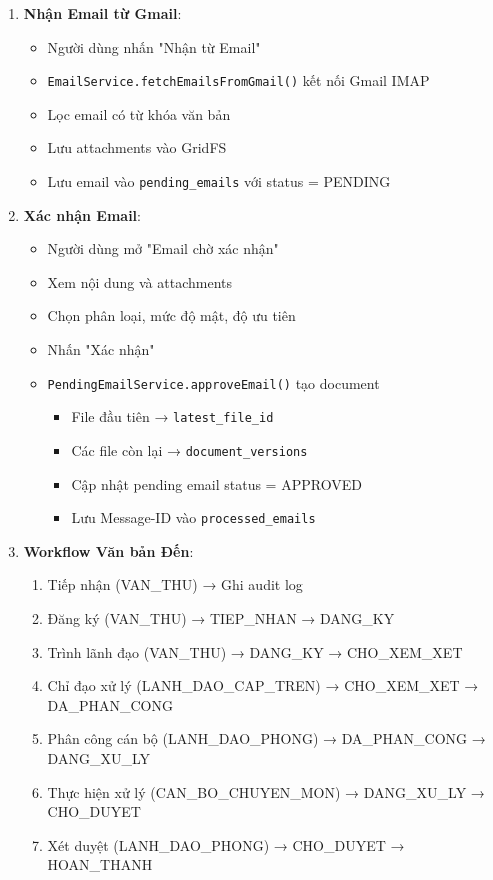 \documentclass[12pt,a4paper]{article}
\begin{document}
\begin{enumerate}
    \item \textbf{Nhận Email từ Gmail}:
    \begin{itemize}
        \item Người dùng nhấn "Nhận từ Email"
        \item \texttt{EmailService.fetchEmailsFromGmail()} kết nối Gmail IMAP
        \item Lọc email có từ khóa văn bản
        \item Lưu attachments vào GridFS
        \item Lưu email vào \texttt{pending\_emails} với status = PENDING
    \end{itemize}
    
    \item \textbf{Xác nhận Email}:
    \begin{itemize}
        \item Người dùng mở "Email chờ xác nhận"
        \item Xem nội dung và attachments
        \item Chọn phân loại, mức độ mật, độ ưu tiên
        \item Nhấn "Xác nhận"
        \item \texttt{PendingEmailService.approveEmail()} tạo document
        \begin{itemize}
            \item File đầu tiên → \texttt{latest\_file\_id}
            \item Các file còn lại → \texttt{document\_versions}
            \item Cập nhật pending email status = APPROVED
            \item Lưu Message-ID vào \texttt{processed\_emails}
        \end{itemize}
    \end{itemize}
    
    \item \textbf{Workflow Văn bản Đến}:
    \begin{enumerate}
        \item Tiếp nhận (VAN\_THU) → Ghi audit log
        \item Đăng ký (VAN\_THU) → TIEP\_NHAN → DANG\_KY
        \item Trình lãnh đạo (VAN\_THU) → DANG\_KY → CHO\_XEM\_XET
        \item Chỉ đạo xử lý (LANH\_DAO\_CAP\_TREN) → CHO\_XEM\_XET → DA\_PHAN\_CONG
        \item Phân công cán bộ (LANH\_DAO\_PHONG) → DA\_PHAN\_CONG → DANG\_XU\_LY
        \item Thực hiện xử lý (CAN\_BO\_CHUYEN\_MON) → DANG\_XU\_LY → CHO\_DUYET
        \item Xét duyệt (LANH\_DAO\_PHONG) → CHO\_DUYET → HOAN\_THANH
    \end{enumerate}
\end{enumerate}
\end{document}

